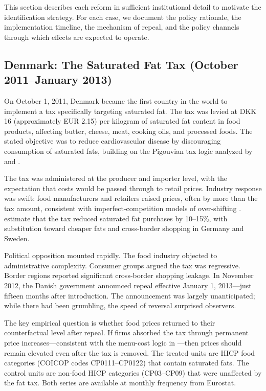 \documentclass[12pt]{article}
\begin{document}
This section describes each reform in sufficient institutional detail to motivate the identification strategy. For each case, we document the policy rationale, the implementation timeline, the mechanism of repeal, and the policy channels through which effects are expected to operate.

\subsection{Denmark: The Saturated Fat Tax (October 2011--January 2013)}

On October 1, 2011, Denmark became the first country in the world to implement a tax specifically targeting saturated fat. The tax was levied at DKK 16 (approximately EUR 2.15) per kilogram of saturated fat content in food products, affecting butter, cheese, meat, cooking oils, and processed foods. The stated objective was to reduce cardiovascular disease by discouraging consumption of saturated fats, building on the Pigouvian tax logic analyzed by \citet{allcott2019regressive} and \citet{gruber2001tobacco}.

The tax was administered at the producer and importer level, with the expectation that costs would be passed through to retail prices. Industry response was swift: food manufacturers and retailers raised prices, often by more than the tax amount, consistent with imperfect-competition models of over-shifting \citep{chetty2009salience}. \citet{jensen2016danish} estimate that the tax reduced saturated fat purchases by 10--15\%, with substitution toward cheaper fats and cross-border shopping in Germany and Sweden.

Political opposition mounted rapidly. The food industry objected to administrative complexity. Consumer groups argued the tax was regressive. Border regions reported significant cross-border shopping leakage. In November 2012, the Danish government announced repeal effective January 1, 2013---just fifteen months after introduction. The announcement was largely unanticipated; while there had been grumbling, the speed of reversal surprised observers.

The key empirical question is whether food prices returned to their counterfactual level after repeal. If firms absorbed the tax through permanent price increases---consistent with the menu-cost logic in ---then prices should remain elevated even after the tax is removed. The treated units are HICP food categories (COICOP codes CP0111--CP0122) that contain saturated fats. The control units are non-food HICP categories (CP03--CP09) that were unaffected by the fat tax. Both series are available at monthly frequency from Eurostat.
\end{document}
